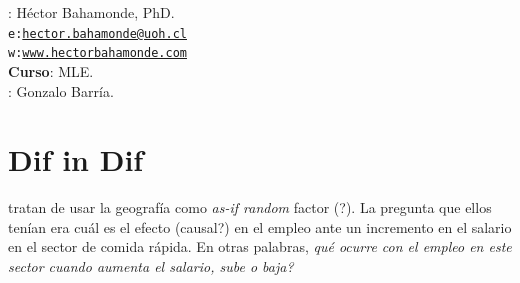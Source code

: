 \documentclass[onesided]{article}\usepackage[]{graphicx}\usepackage[]{color}
\begin{document}











\hspace{-5mm}{\bf Profesor}: H\'ector Bahamonde, PhD.\\
\texttt{e:}\href{mailto:hector.bahamonde@uoh.cl}{\texttt{hector.bahamonde@uoh.cl}}\\
\texttt{w:}\href{http://www.hectorbahamonde.com}{\texttt{www.hectorbahamonde.com}}\\
{\bf Curso}: MLE.\\
\hspace{-5mm}{\bf TA}: Gonzalo Barr\'ia.

\section{Dif in Dif}

\textcite{Card1994} tratan de usar la geograf\'ia como \emph{as-if random} factor ({\color{red}?}). La pregunta que ellos ten\'ian era cu\'al es el efecto (causal?) en el empleo ante un incremento en el salario en el sector de comida r\'apida. En otras palabras, \emph{qu\'e ocurre con el empleo en este sector cuando aumenta el salario, sube o baja?}
\end{document}
